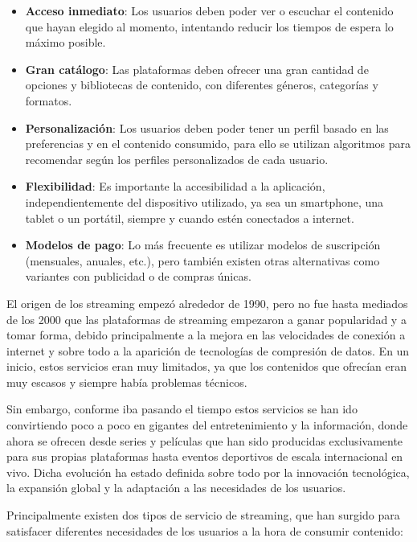 \documentclass[12pt,a4paper]{article}
\begin{document}
\begin{itemize}
    \item \textbf{Acceso inmediato}: Los usuarios deben poder ver o escuchar el contenido que hayan elegido al momento, intentando reducir los tiempos de espera lo máximo posible.
    \item \textbf{Gran catálogo}: Las plataformas deben ofrecer una gran cantidad de opciones y bibliotecas de contenido, con diferentes géneros, categorías y formatos.
    \item \textbf{Personalización}: Los usuarios deben poder tener un perfil basado en las preferencias y en el contenido consumido, para ello se utilizan algoritmos para recomendar según los perfiles personalizados de cada usuario.
    \item \textbf{Flexibilidad}: Es importante la accesibilidad a la aplicación, independientemente del dispositivo utilizado, ya sea un smartphone, una tablet o un portátil, siempre y cuando estén conectados a internet.
    \item \textbf{Modelos de pago}: Lo más frecuente es utilizar modelos de suscripción (mensuales, anuales, etc.), pero también existen otras alternativas como variantes con publicidad o de compras únicas.
\end{itemize}

El origen de los streaming empezó alrededor de 1990, pero no fue hasta mediados de los 2000 que las plataformas de streaming empezaron a ganar popularidad y a tomar forma, debido principalmente a la mejora en las velocidades de conexión a internet y sobre todo a la aparición de tecnologías de compresión de datos. En un inicio, estos servicios eran muy limitados, ya que los contenidos que ofrecían eran muy escasos y siempre había problemas técnicos.

Sin embargo, conforme iba pasando el tiempo estos servicios se han ido convirtiendo poco a poco en gigantes del entretenimiento y la información, donde ahora se ofrecen desde series y películas que han sido producidas exclusivamente para sus propias plataformas hasta eventos deportivos de escala internacional en vivo. Dicha evolución ha estado definida sobre todo por la innovación tecnológica, la expansión global y la adaptación a las necesidades de los usuarios.

\newpage

Principalmente existen dos tipos de servicio de streaming, que han surgido para satisfacer diferentes necesidades de los usuarios a la hora de consumir contenido:
\end{document}

